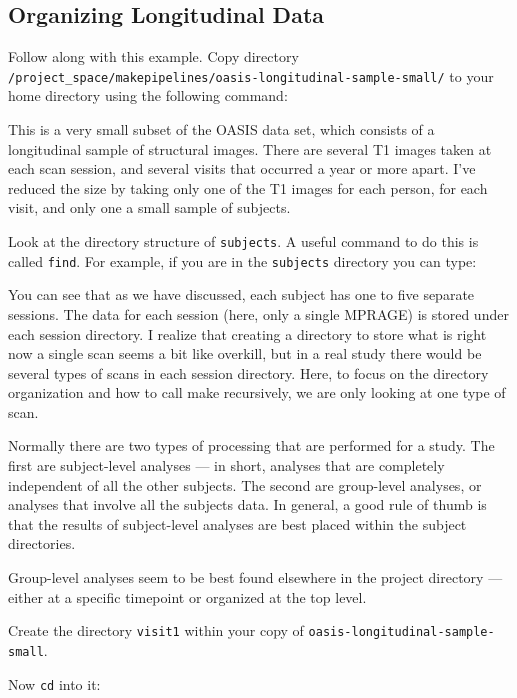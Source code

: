 \subsection{Organizing Longitudinal Data}

Follow along with this example. Copy directory 
\newline\texttt{/project_space/makepipelines/oasis-longitudinal-sample-small/} \newline
to your home directory using the following command:

This is a very small subset of the OASIS data set, which consists of a
longitudinal sample of structural images. There are several T1 images
taken at each scan session, and several visits that occurred a year or
more apart. I’ve reduced the size by taking only one of the T1 images
for each person, for each visit, and only one a small sample of
subjects.

Look at the directory structure of \texttt{subjects}. A useful command to do this is called \texttt{find}. For example, if you are in the \texttt{subjects} directory you can type:

You can see that as we have discussed, each subject has one to five
separate sessions. The data for each session (here, only a single
MPRAGE) is stored under each session directory. I realize that
creating a directory to store what is right now a single scan seems a
bit like overkill, but in a real study there would be several types of
scans in each session directory. Here, to focus on the directory
organization and how to call make recursively, we are only looking at
one type of scan.

Normally there are two types of processing that are performed for a
study. The first are subject-level analyses --- in short, analyses that
are completely independent of all the other subjects. The second are
group-level analyses, or analyses that involve all the subjects
data. In general, a good rule of thumb is that the results of
subject-level analyses are best placed within the subject directories.

Group-level analyses seem to be best found elsewhere in the project
directory --- either at a specific timepoint or organized at the top
level.

Create the directory \texttt{visit1} within your copy of \texttt{oasis-longitudinal-sample-small}. 

Now \texttt{cd} into it:

